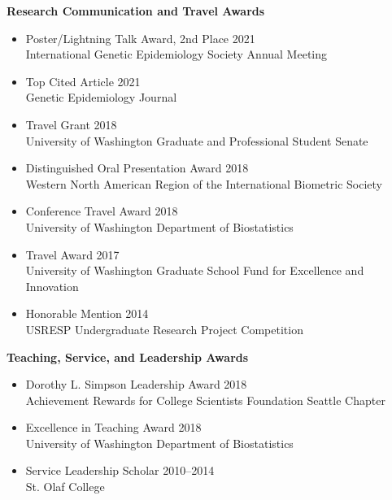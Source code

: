\documentclass[margin]{res}
\begin{document}
\begin{resume}
\textbf{Research Communication and Travel Awards}
\begin{itemize}
\item Poster/Lightning Talk Award, 2nd Place \hfill 2021 \\
International Genetic Epidemiology Society Annual Meeting
\item Top Cited Article  \hfill 2021 \\
Genetic Epidemiology Journal
\item Travel Grant \hfill 2018 \\ University of Washington Graduate and Professional Student Senate
\item Distinguished Oral Presentation Award  \hfill 2018 \\ Western North American Region of the International Biometric Society  %
\item Conference Travel Award \hfill 2018 \\
University of Washington Department of Biostatistics
\item Travel Award \hfill 2017 \\
University of Washington Graduate School Fund for Excellence and Innovation
\item Honorable Mention \hfill 2014 \\ 
USRESP Undergraduate Research Project Competition \\
\end{itemize}

\textbf{Teaching, Service, and Leadership Awards}
\begin{itemize}
\item Dorothy L. Simpson Leadership Award \hfill 2018 \\ Achievement Rewards for College Scientists Foundation Seattle Chapter 
\item Excellence in Teaching Award  \hfill 2018 \\
University of Washington Department of Biostatistics
\item Service Leadership Scholar \hfill 2010--2014 \\ St. Olaf College \\
\end{itemize}


\end{resume}
\end{document}
